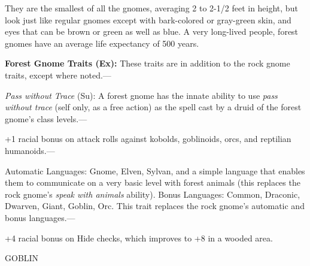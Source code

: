 \documentclass{article}
\begin{document}
They are the smallest of all the gnomes, averaging 2 to 2-1/2 feet in height, but 
look just like regular gnomes except with bark-colored or gray-green skin, and 
eyes that can be brown or green as well as blue. A very long-lived people, forest 
gnomes have an average life expectancy of 500 years.

\textbf{Forest Gnome Traits (Ex):} These traits are in addition to the rock gnome 
traits, except where noted.---

\textit{Pass without Trace }(Su): A forest gnome has the innate ability to use 
\textit{pass without trace }(self only, as a free action) as the spell cast by 
a druid of the forest gnome's class levels.--- 

\parindent=3pt
+1 racial bonus on attack rolls against kobolds, goblinoids, orcs, and reptilian 
humanoids.---

\parindent=0pt
Automatic Languages: Gnome, Elven, Sylvan, and a simple language that enables them 
to communicate on a very basic level with forest animals (this replaces the rock 
gnome's \textit{speak with animals }ability). Bonus Languages: Common, Draconic, 
Dwarven, Giant, Goblin, Orc. This trait replaces the rock gnome's automatic and 
bonus languages.--- 

\parindent=3pt
+4 racial bonus on Hide checks, which improves to +8 in a wooded area.

\vspace{12pt}
\parindent=0pt
{\LARGE{}GOBLIN}
\end{document}
